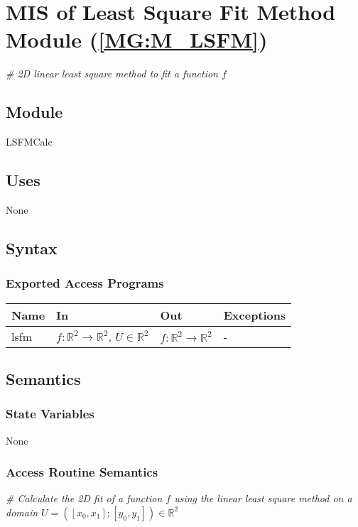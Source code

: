 \documentclass[12pt, titlepage]{article}
\begin{document}
\section{MIS of Least Square Fit Method Module 
(\texorpdfstring{\cref{MG:M_LSFM}}))} \label{MIS_LSFM}

\textit{{\#} 2D linear least square method to fit a function $f$} \medskip

\subsection{Module}
LSFMCalc
\subsection{Uses}
None
\subsection{Syntax}

\subsubsection{Exported Access Programs}

\begin{center}
\begin{tabular}{p{2cm} p{4cm} p{4cm} p{2cm}}
\hline
\textbf{Name} & \textbf{In} & \textbf{Out} & \textbf{Exceptions} \\
\hline
lsfm & $f:\mathbb{R}^2\rightarrow\mathbb{R}^2$, $U \in \mathbb{R}^2$ & 
$f:\mathbb{R}^2\rightarrow\mathbb{R}^2$ & - \\
\hline
\end{tabular}
\end{center}

\subsection{Semantics}

\subsubsection{State Variables}
None

\subsubsection{Access Routine Semantics}

\noindent\textit{{\#} Calculate the 2D fit of a function $f$ using the linear 
least square method on a domain $U=([x_0,x_1];[y_0,y_1]) \in \mathbb{R}^2$} 
\medskip
\end{document}
